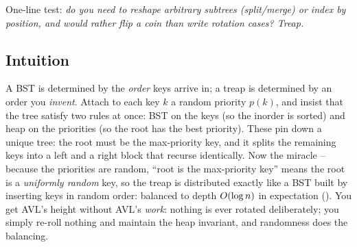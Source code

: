 \begin{recognitionbox}
One-line test: \emph{do you need to reshape arbitrary subtrees (split/merge) or index by position, and
would rather flip a coin than write rotation cases? Treap.}
\end{recognitionbox}

\subsection{Intuition}

A BST is determined by the \emph{order} keys arrive in; a treap is determined by an order you
\emph{invent}. Attach to each key $k$ a random priority $p(k)$, and insist that the tree satisfy two
rules at once: BST on the keys (so the inorder is sorted) and heap on the priorities (so the root has the
best priority). These pin down a unique tree: the root must be the max-priority key, and it splits the
remaining keys into a left and a right block that recurse identically. Now the miracle -- because the
priorities are random, ``root is the max-priority key'' means the root is a \emph{uniformly random} key,
so the treap is distributed exactly like a BST built by inserting keys in random order: balanced to
depth $O(\log n)$ in expectation (). You get AVL's height without AVL's
\emph{work}: nothing is ever rotated deliberately; you simply re-roll nothing and maintain the heap
invariant, and randomness does the balancing.

